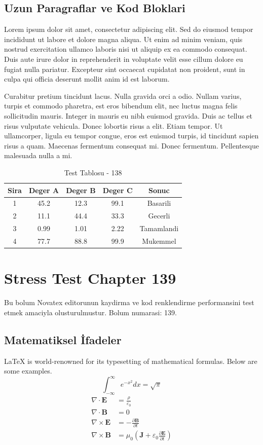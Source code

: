 \documentclass[12pt,a4paper]{article}
\begin{document}
\subsection{Uzun Paragraflar ve Kod Bloklari}
Lorem ipsum dolor sit amet, consectetur adipiscing elit. Sed do eiusmod tempor incididunt ut labore et dolore magna aliqua. Ut enim ad minim veniam, quis nostrud exercitation ullamco laboris nisi ut aliquip ex ea commodo consequat. Duis aute irure dolor in reprehenderit in voluptate velit esse cillum dolore eu fugiat nulla pariatur. Excepteur sint occaecat cupidatat non proident, sunt in culpa qui officia deserunt mollit anim id est laborum.

Curabitur pretium tincidunt lacus. Nulla gravida orci a odio. Nullam varius, turpis et commodo pharetra, est eros bibendum elit, nec luctus magna felis sollicitudin mauris. Integer in mauris eu nibh euismod gravida. Duis ac tellus et risus vulputate vehicula. Donec lobortis risus a elit. Etiam tempor. Ut ullamcorper, ligula eu tempor congue, eros est euismod turpis, id tincidunt sapien risus a quam. Maecenas fermentum consequat mi. Donec fermentum. Pellentesque malesuada nulla a mi.

\begin{table}[h!]
\centering
\begin{tabular}{|c|c|c|c|c|}
\hline
\textbf{Sira} & \textbf{Deger A} & \textbf{Deger B} & \textbf{Deger C} & \textbf{Sonuc} \\
\hline
1 & 45.2 & 12.3 & 99.1 & Basarili \\
2 & 11.1 & 44.4 & 33.3 & Gecerli \\
3 & 0.99 & 1.01 & 2.22 & Tamamlandi \\
4 & 77.7 & 88.8 & 99.9 & Mukemmel \\
\hline
\end{tabular}
\caption{Test Tablosu - 138}
\end{table}

\newpage
\section{Stress Test Chapter 139}
Bu bolum Novatex editorunun kaydirma ve kod renklendirme performansini test etmek amaciyla olusturulmustur. Bolum numarasi: 139.

\subsection{Matematiksel İfadeler}
\LaTeX{} is world-renowned for its typesetting of mathematical formulas. Below are some examples.
\begin{equation}
\int_{-\infty}^{\infty} e^{-x^2} dx = \sqrt{\pi}
\end{equation}
\begin{align}
\nabla \cdot \mathbf{E} &= \frac{\rho}{\varepsilon_0} \\
\nabla \cdot \mathbf{B} &= 0 \\
\nabla \times \mathbf{E} &= -\frac{\partial \mathbf{B}}{\partial t} \\
\nabla \times \mathbf{B} &= \mu_0\left(\mathbf{J} + \varepsilon_0 \frac{\partial \mathbf{E}}{\partial t}\right)
\end{align}
\end{document}
